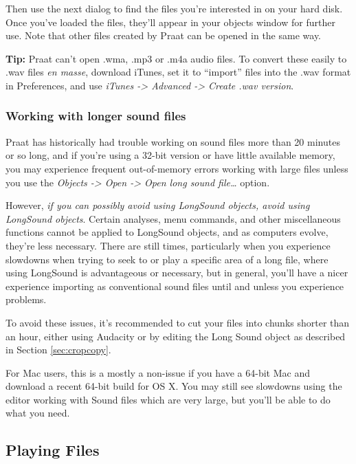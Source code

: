 Then use the next dialog to find the files you're interested in on your
hard disk. Once you've loaded the files, they'll appear in your objects
window for further use. Note that other files created by Praat can be
opened in the same way.

\textbf{Tip:} Praat can't open .wma, .mp3 or .m4a audio files. To
convert these easily to .wav files \emph{en masse}, download iTunes, set
it to ``import'' files into the .wav format in Preferences, and use
\emph{iTunes -\textgreater{} Advanced -\textgreater{} Create .wav
version}.

\hypertarget{working-with-longer-sound-files}{%
\subsubsection{Working with longer sound
files}\label{working-with-longer-sound-files}}

\label{longsounds}

Praat has historically had trouble working on sound files more than 20
minutes or so long, and if you're using a 32-bit version or have little
available memory, you may experience frequent out-of-memory errors
working with large files unless you use the \emph{Objects
-\textgreater{} Open -\textgreater{} Open long sound file\ldots{}}
option.

However, \emph{if you can possibly avoid using LongSound objects, avoid
using LongSound objects}. Certain analyses, menu commands, and other
miscellaneous functions cannot be applied to LongSound objects, and as
computers evolve, they're less necessary. There are still times,
particularly when you experience slowdowns when trying to seek to or
play a specific area of a long file, where using LongSound is
advantageous or necessary, but in general, you'll have a nicer
experience importing as conventional sound files until and unless you
experience problems.

To avoid these issues, it's recommended to cut your files into chunks
shorter than an hour, either using Audacity or by editing the Long Sound
object as described in Section \ref{sec:cropcopy}.

For Mac users, this is a mostly a non-issue if you have a 64-bit Mac and
download a recent 64-bit build for OS X. You may still see slowdowns
using the editor working with Sound files which are very large, but
you'll be able to do what you need.

\hypertarget{playing-files}{%
\subsection{Playing Files}\label{playing-files}}

